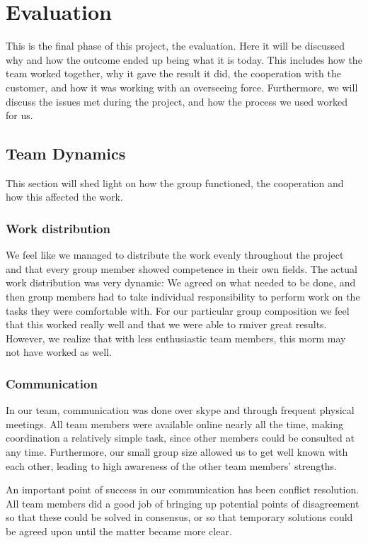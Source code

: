 \chapter{Evaluation}

\minitoc
This is the final phase of this project, the evaluation. Here it will be discussed why and how the outcome ended up being what it is today. This includes how the team worked together, why it gave the result it did, the cooperation with the customer, and how it was working with an overseeing force. Furthermore, we will discuss the issues met during the project, and how the process we used worked for us.

\clearpage

\section{Team Dynamics}
This section will shed light on how the group functioned, the cooperation and how this affected the work.

\subsection*{Work distribution}
We feel like we managed to distribute the work evenly throughout the project and that every group member showed competence in their own fields. The actual work distribution was very dynamic: We agreed on what needed to be done, and then group members had to take individual responsibility to perform work on the tasks they were comfortable with. For our particular group composition we feel that this worked really well and that we were able to rmiver great results. However, we realize that with less enthusiastic team members, this morm may not have worked as well.

\subsection*{Communication}
In our team, communication was done over skype and through frequent physical meetings. All team members were available online nearly all the time, making coordination a relatively simple task, since other members could be consulted at any time. Furthermore, our small group size allowed us to get well known with each other, leading to high awareness of the other team members’ strengths.

An important point of success in our communication has been conflict resolution. All team members did a good job of bringing up potential points of disagreement so that these could be solved in consensus, or so that temporary solutions could be agreed upon until the matter became more clear.

